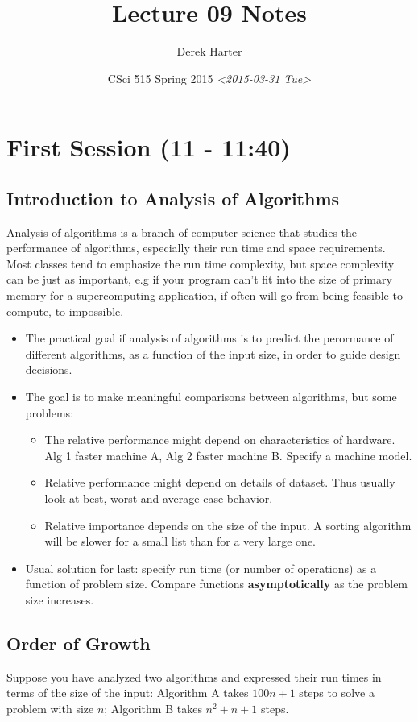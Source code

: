 \documentclass[11pt]{article}
\author{Derek Harter}
\date{CSci 515 Spring 2015 \textit{<2015-03-31 Tue>}}
\title{Lecture 09 Notes}
\begin{document}
\maketitle

\section{First Session (11 - 11:40)}
\label{sec-1}
\subsection{Introduction to Analysis of Algorithms}
\label{sec-1-1}
Analysis of algorithms is a branch of computer science that studies
the performance of algorithms, especially their run time and space
requirements.  Most classes tend to emphasize the run time complexity,
but space complexity can be just as important, e.g if your program
can't fit into the size of primary memory for a supercomputing
application, if often will go from being feasible to compute, to
impossible.

\begin{itemize}
\item The practical goal if analysis of algorithms is to predict the
perormance of different algorithms, as a function of the input size,
in order to guide design decisions.
\item The goal is to make meaningful comparisons between algorithms, but
some problems:
\begin{itemize}
\item The relative performance might depend on characteristics of hardware.
Alg 1 faster machine A, Alg 2 faster machine B.  Specify a machine model.
\item Relative performance might depend on details of dataset.  Thus usually
look at best, worst and average case behavior.
\item Relative importance depends on the size of the input.  A sorting
algorithm will be slower for a small list than for a very large one.
\end{itemize}
\item Usual solution for last: specify run time (or number of operations)
as a function of problem size.  Compare functions \textbf{asymptotically} 
as the problem size increases.
\end{itemize}
\subsection{Order of Growth}
\label{sec-1-2}
Suppose you have analyzed two algorithms and expressed their run times in
terms of the size of the input: Algorithm A takes $100n + 1$ steps
to solve a problem with size $n$; Algorithm B takes $n^2 + n + 1$ steps.
\end{document}

